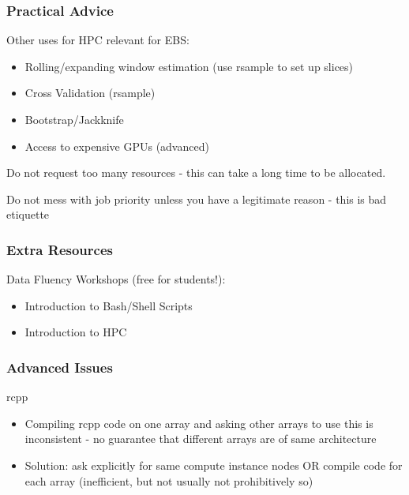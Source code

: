 \documentclass[aspectratio=169,notheorems]{beamer}
\theoremstyle{plain}
\theoremstyle{plain}
\numberwithin{equation}{section}
\begin{document}
\begin{frame}
\frametitle{Practical Advice}
Other uses for HPC relevant for EBS:
\begin{itemize}
\item Rolling/expanding window estimation (use rsample to set up slices)
\item Cross Validation (rsample)
\item Bootstrap/Jackknife
\item Access to expensive GPUs (advanced)
\end{itemize}

Do not request too many resources - this can take a long time to be allocated.

Do not mess with job priority unless you have a legitimate reason - this is bad etiquette
\end{frame}

\begin{frame}
\frametitle{Extra Resources}
Data Fluency Workshops (free for students!):
\begin{itemize}
\item Introduction to Bash/Shell Scripts
\item Introduction to HPC
\end{itemize}
\end{frame}

\begin{frame}
\frametitle{Advanced Issues}
rcpp
\begin{itemize}
\item Compiling rcpp code on one array and asking other arrays to use this is inconsistent - no guarantee that different arrays are of same architecture
\item Solution: ask explicitly for same compute instance nodes OR compile code for each array (inefficient, but not usually not prohibitively so)
\end{itemize}
\end{frame}
\end{document}
